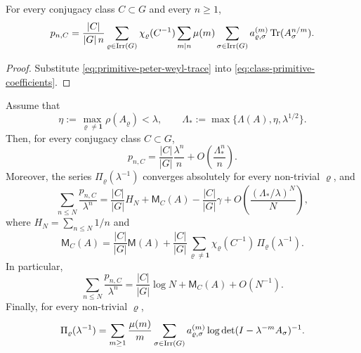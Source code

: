 \begin{corollary}
  \label{cor:class-artin-mobius-trace}
  For every conjugacy class \(C\subset G\) and every \(n\ge 1\),
  \begin{equation}\label{eq:class-artin-mobius-trace}
    p_{n,C}
    =
    \frac{|C|}{|G|\,n}
      \sum_{\varrho\in\operatorname{Irr}(G)}
        \chi_\varrho(C^{-1})
        \sum_{m\mid n}\mu(m)
          \sum_{\sigma\in\operatorname{Irr}(G)}
            a_{\varrho,\sigma}^{(m)}
            \operatorname{Tr}(A_\sigma^{n/m}).
  \end{equation}
\end{corollary}

\begin{proof}
  Substitute \eqref{eq:primitive-peter-weyl-trace} into
  \eqref{eq:class-primitive-coefficients}.
\end{proof}

\begin{theorem}
  \label{thm:class-mertens-explicit}
  Assume that
  \[
    \eta:=\max_{\varrho\neq\mathbf 1}\rho(A_\varrho)<\lambda,
    \qquad
    \Lambda_*:=\max\{\Lambda(A),\eta,\lambda^{1/2}\}.
  \]
  Then, for every conjugacy class \(C\subset G\),
  \begin{equation}\label{eq:class-primitive-asymptotic}
    p_{n,C}
    =
    \frac{|C|}{|G|}\frac{\lambda^n}{n}
    +O\!\left(\frac{\Lambda_*^n}{n}\right).
  \end{equation}
  Moreover, the series \(\Pi_\varrho(\lambda^{-1})\) converges
  absolutely for every non-trivial \(\varrho\), and
  \begin{equation}\label{eq:class-mertens-harmonic}
    \sum_{n\le N}\frac{p_{n,C}}{\lambda^n}
    =
    \frac{|C|}{|G|}H_N
    +\mathsf M_C(A)-\frac{|C|}{|G|}\gamma
    +O\!\left(\frac{(\Lambda_*/\lambda)^N}{N}\right),
  \end{equation}
  where \(H_N=\sum_{n\le N}1/n\) and
  \begin{equation}\label{eq:class-mertens-constant}
    \mathsf M_C(A)
    =
    \frac{|C|}{|G|}\mathsf M(A)
    +\frac{|C|}{|G|}
      \sum_{\varrho\neq\mathbf 1}
        \chi_\varrho(C^{-1})\,\Pi_\varrho(\lambda^{-1}).
  \end{equation}
  In particular,
  \begin{equation}\label{eq:class-mertens-log}
    \sum_{n\le N}\frac{p_{n,C}}{\lambda^n}
    =
    \frac{|C|}{|G|}\log N+\mathsf M_C(A)+O(N^{-1}).
  \end{equation}
  Finally, for every non-trivial \(\varrho\),
  \begin{equation}\label{eq:class-mertens-determinant}
    \Pi_\varrho(\lambda^{-1})
    =
    \sum_{m\ge 1}\frac{\mu(m)}{m}
      \sum_{\sigma\in\operatorname{Irr}(G)}
        a_{\varrho,\sigma}^{(m)}
        \log\det(I-\lambda^{-m}A_\sigma)^{-1}.
  \end{equation}
\end{theorem}

